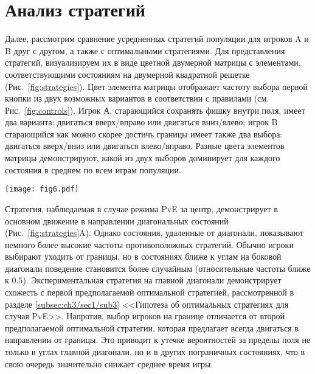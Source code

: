 \section{Анализ стратегий}\label{sec:ch3/sec5}

Далее, рассмотрим сравнение усредненных стратегий популяции для игроков A и B друг с другом, а также с оптимальными стратегиями. 
Для представления стратегий, визуализируем их в виде цветной двумерной матрицы с элементами, 
соответствующими состояниям на двумерной квадратной решетке (Рис.~\cref{fig:strategies}). 
Цвет элемента матрицы отображает частоту выбора первой кнопки из двух возможных вариантов в соответствии с правилами (см. Рис.~\cref{fig:controls}). 
Игрок А, старающийся сохранять фишку внутри поля, имеет два варианта: двигаться вверх/вправо или двигаться вниз/влево; 
игрок B старающийся как можно скорее достичь границы имеет также два выбора: двигаться вверх/вниз или двигаться влево/вправо. 
Разные цвета элементов матрицы демонстрируют, какой из двух выборов доминирует для каждого состояния в среднем по всем играм популяции.

\begin{figure*}[t]
    \begin{center}
    \texttt{[image: fig6.pdf]}
    \caption{
        Визуализация средних популяционных стратегий для разных режимов, полученных в эксперименте. 
        Цвет ячеек отображает частоту выбора первой чистой стратегии: для игры за центр (A, B, C) и для игры за границу (D, E, F).
    }  
    \label{fig:strategies}
    \end{center}
\end{figure*}

Стратегия, наблюдаемая в случае режима PvE за центр, демонстрирует в основном движение в направлении диагональных состояний (Рис.~\cref{fig:strategies}A). 
Однако состояния, удаленные от диагонали, показывают немного более высокие частоты противоположных стратегий. 
Обычно игроки выбирают уходить от границы, но в состояниях ближе к углам на боковой диагонали поведение становится более случайным 
(относительные частоты ближе к $0.5$). Экспериментальная стратегия на главной диагонали демонстрирует схожесть с первой предполагаемой оптимальной стратегией, 
рассмотренной в разделе \cref{subsec:ch3/sec1/sub3} <<Гипотеза об оптимальных стратегиях для случая PvE>>. Напротив, выбор игроков на границе отличается от второй предполагаемой оптимальной стратегии, 
которая предлагает всегда двигаться в направлении от границы. Это приводит к утечке вероятностей за пределы поля не только в углах главной диагонали, 
но и в других пограничных состояниях, что в свою очередь значительно снижает среднее время игры. 


